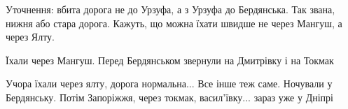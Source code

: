  
 
 
 
 

\qqSecCmt


Уточнення: вбита дорога не до Урзуфа, а з Урзуфа до Бердянська. Так звана,
нижня або стара дорога. Кажуть, що можна їхати швидше не через Мангуш, а через
Ялту.


Їхали через Мангуш. Перед Бердянськом звернули на Дмитрівку і на Токмак


Учора їхали через ялту, дорога нормальна... Все інше теж саме. Ночували у
Бердянську. Потім Запоріжжя, через токмак, васил'ївку... зараз уже у Дніпрі
